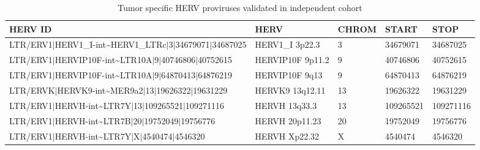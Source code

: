 \begin{table}[ht]
\centering
\caption{Tumor specific HERV proviruses validated in independent cohort} 
\label{tab:valsupp}
\begingroup\footnotesize
\begin{tabular}{lllll}
 {\textbf{HERV ID}} & {\textbf{HERV}} & {\textbf{CHROM}} & {\textbf{START}} & {\textbf{STOP}} \\ 
  \hline
LTR/ERV1$|$HERV1\_I-int\~{}HERV1\_LTRc$|$3$|$34679071$|$34687025 & HERV1\_I 3p22.3 & 3 & 34679071 & 34687025 \\ 
  LTR/ERV1$|$HERVIP10F-int\~{}LTR10A$|$9$|$40746806$|$40752615 & HERVIP10F 9p11.2 & 9 & 40746806 & 40752615 \\ 
  LTR/ERV1$|$HERVIP10F-int\~{}LTR10A$|$9$|$64870413$|$64876219 & HERVIP10F 9q13 & 9 & 64870413 & 64876219 \\ 
  LTR/ERVK$|$HERVK9-int\~{}MER9a2$|$13$|$19626322$|$19631229 & HERVK9 13q12.11 & 13 & 19626322 & 19631229 \\ 
  LTR/ERV1$|$HERVH-int\~{}LTR7Y$|$13$|$109265521$|$109271116 & HERVH 13q33.3 & 13 & 109265521 & 109271116 \\ 
  LTR/ERV1$|$HERVH-int\~{}LTR7B$|$20$|$19752049$|$19756776 & HERVH 20p11.23 & 20 & 19752049 & 19756776 \\ 
  LTR/ERV1$|$HERVH-int\~{}LTR7Y$|$X$|$4540474$|$4546320 & HERVH Xp22.32 & X & 4540474 & 4546320 \\ 
   \hline
\end{tabular}
\endgroup
\end{table}

